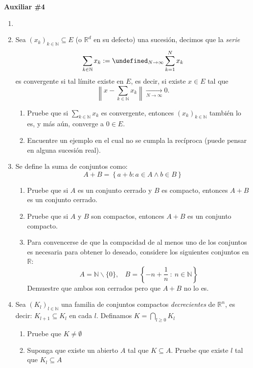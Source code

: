 \documentclass[letterpaper,11pt]{article}
\let\lim=\undefined\DeclareMathOperator*{\lim}{\text{lím}}
\newcommand{\conv}[2]{\xrightarrow[#1\to#2]{}}
\newcommand{\N}{\mathbb{N}}
\newcommand{\R}{\mathbb{R}}
\begin{document}
\begin{center}
	\LARGE \bf{Auxiliar \#4}\\
\end{center}

\vspace{-1cm}
\begin{enumerate}\setlength{\itemsep}{0.4cm}	
\item[]

\item Sea $(x_k)_{k\in\N}\subseteq E$ (o $\R^d$ en su defecto) una sucesión, decimos que la \textit{serie} 
\[\sum_{k\in\N}x_k:=\lim_{N\to\infty}\sum_{k=1}^N x_k \]
es convergente si tal límite existe en $E$, es decir, si existe $x\in E$ tal que
\[\left\lVert x - \sum_{k\in\N}x_k \right\rVert \conv{N}{\infty}0.\]
    \begin{enumerate}
        \item Pruebe que si $\sum_{k\in\N}x_k$ es convergente, entonces $(x_k)_{k\in\N}$ también lo es, y más aún, converge a $0\in E$.
        \item Encuentre un ejemplo en el cual no se cumpla la recíproca (puede pensar en alguna sucesión real).
    \end{enumerate}

\item 
Se define la suma de conjuntos como:
\[A+B=\left\{a+b: a\in A  \wedge b\in B \right\}\]
    \begin{enumerate}
        \item Pruebe que si $A$ es un conjunto cerrado y $B$ es compacto, entonces $A+B$ es un conjunto cerrado.
        \item Pruebe que si $A$ y $B$ son compactos, entonces $A+B$ es un conjunto compacto.
        \item Para convencerse de que la compacidad de al menos uno de los conjuntos es necesaria para obtener lo deseado, considere los siguientes conjuntos en $\R$:
        $$A=\mathbb{N}\backslash \{0\},\ \ \ \ B=\left \{ -n+\frac{1}{n}\ :\
        n\in\mathbb{N}\right \}$$
        Demuestre que ambos son cerrados pero que $A+B$ no lo es.\\
    \end{enumerate}
\item Sea $(K_l)_{l\in\mathbb{N}}$ una familia de conjuntos compactos \textit{decrecientes} de $\mathbb{R}^n$, es decir: $K_{l+1}\subseteq K_{l}$ en cada $l$. Definamos $K=\bigcap_{l\geq0}K_l$
    \begin{enumerate}
        \item Pruebe que $K\neq\emptyset$
        \item Suponga que existe un abierto $A$ tal que $K\subseteq A$. Pruebe que existe $l$ tal que $K_l\subseteq A$ 
    \end{enumerate}
\end{enumerate}
\end{document}
